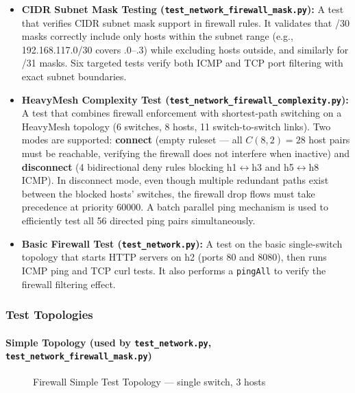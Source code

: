 \documentclass[12pt,a4paper]{article}
\begin{document}
\begin{itemize}[leftmargin=1.5cm]
    \item \textbf{CIDR Subnet Mask Testing (\texttt{test\_network\_firewall\_mask.py}):} A test that verifies CIDR subnet mask support in firewall rules. It validates that /30 masks correctly include only hosts within the subnet range (e.g., 192.168.117.0/30 covers .0--.3) while excluding hosts outside, and similarly for /31 masks. Six targeted tests verify both ICMP and TCP port filtering with exact subnet boundaries.
    \item \textbf{HeavyMesh Complexity Test (\texttt{test\_network\_firewall\_complexity.py}):} A test that combines firewall enforcement with shortest-path switching on a HeavyMesh topology (6 switches, 8 hosts, 11 switch-to-switch links). Two modes are supported: \textbf{connect} (empty ruleset --- all $C(8,2)=28$ host pairs must be reachable, verifying the firewall does not interfere when inactive) and \textbf{disconnect} (4 bidirectional deny rules blocking h1$\leftrightarrow$h3 and h5$\leftrightarrow$h8 ICMP). In disconnect mode, even though multiple redundant paths exist between the blocked hosts' switches, the firewall drop flows must take precedence at priority 60000. A batch parallel ping mechanism is used to efficiently test all 56 directed ping pairs simultaneously.
    \item \textbf{Basic Firewall Test (\texttt{test\_network.py}):} A test on the basic single-switch topology that starts HTTP servers on h2 (ports 80 and 8080), then runs ICMP ping and TCP curl tests. It also performs a \texttt{pingAll} to verify the firewall filtering effect.
\end{itemize}

\subsubsection{Test Topologies}

\paragraph{Simple Topology (used by \texttt{test\_network.py}, \texttt{test\_network\_firewall\_mask.py})}

\begin{figure}[H]
\centering
{}
\caption{Firewall Simple Test Topology --- single switch, 3 hosts}
\end{figure}
\end{document}
